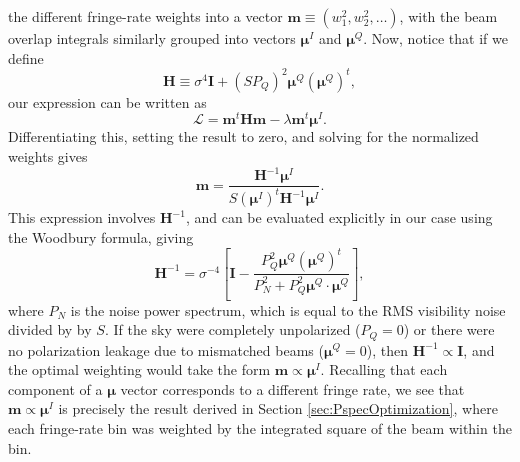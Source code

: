 \documentclass[twocolumn,apj,numberedappendix]{emulateapj}
\begin{document}
the different fringe-rate weights into a vector $\mathbf{m}\equiv( w_1^2, w_2^2, \dots )$, with the beam overlap integrals similarly grouped into
vectors $\boldsymbol \mu^I$ and $\boldsymbol \mu^Q$. Now, notice that if we define
\begin{equation}
\mathbf{H} \equiv \sigma^4 \mathbf{I} + \left(S P_Q \right)^2 \boldsymbol \mu^Q (\boldsymbol \mu^Q)^t,
\end{equation}
our expression can be written as
\begin{equation}
\mathcal L = \mathbf{m}^t \mathbf{H} \mathbf{m} - \lambda \mathbf{m}^t \boldsymbol \mu^I.
\end{equation}
Differentiating this, setting the result to zero, and solving for the normalized weights gives
\begin{equation}
\label{eq:PolOptWeights}
\mathbf{m} =  \frac{\mathbf{H}^{-1}  \boldsymbol \mu^I}{ S (\boldsymbol \mu^I)^t  \mathbf{H}^{-1}  \boldsymbol \mu^I}.
\end{equation}
This expression involves $\mathbf{H}^{-1}$, and can be evaluated explicitly in our case using the
Woodbury formula, giving
\begin{equation}
\label{eq:Hinv}
\mathbf{H}^{-1} = \sigma^{-4} \left[ \mathbf{I} - \frac{P_Q^2\boldsymbol \mu^Q (\boldsymbol \mu^Q)^t }{P_N^2 + P_Q^2 \boldsymbol \mu^Q \cdot \boldsymbol \mu^Q} \right],
\end{equation}
where $P_N$ is the noise power spectrum, which is equal to the RMS visibility
noise divided by by $S$. If the sky were completely unpolarized ($P_Q = 0$) or there were no polarization leakage due to mismatched beams ($\boldsymbol \mu^Q = 0$), then $\mathbf{H}^{-1} \propto \mathbf{I}$, and the optimal weighting would take the form
$\mathbf{m} \propto \boldsymbol \mu^I$. Recalling that each component of a $\boldsymbol \mu$ vector corresponds
to a different fringe rate, we see that $\mathbf{m} \propto \boldsymbol \mu^I$ is precisely the result derived in Section
\ref{sec:PspecOptimization}, where each fringe-rate bin was weighted by the integrated square of the beam within the bin.
\end{document}
